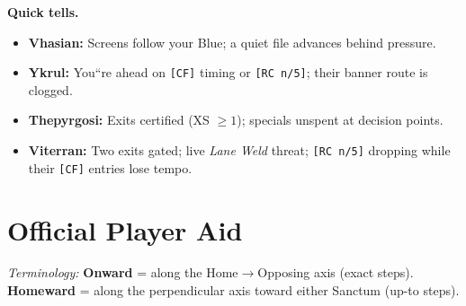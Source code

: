 \documentclass[11pt]{article}
\newcommand{\code}[1]{\texttt{#1}}
\newcommand{\code}[1]{\texttt{#1}}
\begin{document}
\medskip
\noindent\textbf{Quick tells.}
\begin{itemize}[leftmargin=*,itemsep=0.25em]
  \item \textbf{Vhasian:} Screens follow your Blue; a quiet file advances behind pressure.
  \item \textbf{Ykrul:} You``re ahead on \code{[CF]} timing or \code{[RC n/5]}; their banner route is clogged.
  \item \textbf{Thepyrgosi:} Exits certified (XS $\ge 1$); specials unspent at decision points.
  \item \textbf{Viterran:} Two exits gated; live \emph{Lane Weld} threat; \code{[RC n/5]} dropping while their \code{[CF]} entries lose tempo.
\end{itemize}

\clearpage
\appendix
\section{Official Player Aid}
\label{sec:playeraide}


\noindent\footnotesize\emph{Terminology:} \textbf{Onward} = along the Home$\to$Opposing axis (exact steps). \textbf{Homeward} = along the perpendicular axis toward either Sanctum (up-to steps).\normalsize

\end{document}
